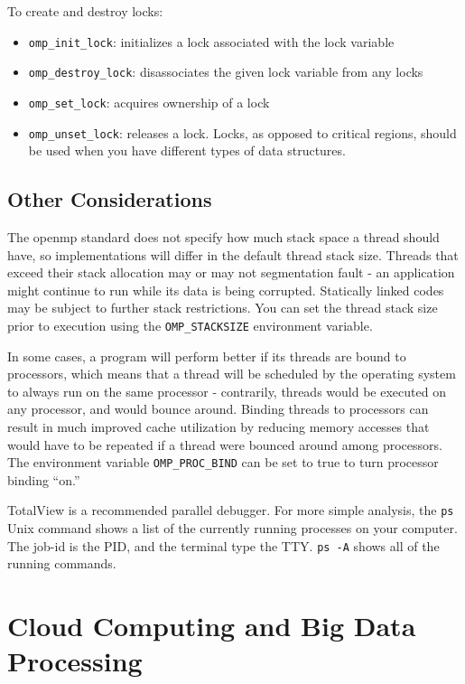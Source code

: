\documentclass[10pt]{article}
\begin{document}
\begin{flushleft}
To create and destroy locks:

\begin{itemize}
\item {\tt omp\_init\_lock}: initializes a lock associated with the lock variable
\item {\tt omp\_destroy\_lock}: disassociates the given lock variable from any locks
\item {\tt omp\_set\_lock}: acquires ownership of a lock
\item {\tt omp\_unset\_lock}: releases a lock. Locks, as opposed to critical regions, should be used when you have different types of data structures.
\end{itemize}

\subsection{Other Considerations}

The \gls{openmp} standard does not specify how much stack space a thread should have, so implementations will differ in the default thread stack size. Threads that exceed their stack allocation may or may not segmentation fault - an application might continue to run while its data is being corrupted. Statically linked codes may be subject to further stack restrictions. You can set the thread stack size prior to execution using the {\tt OMP\_STACKSIZE} environment variable. 

In some cases, a program will perform better if its threads are bound to processors, which means that a thread will be scheduled by the operating system to always run on the same processor - contrarily, threads would be executed on any processor, and would bounce around.  Binding threads to processors can result in much improved cache utilization by reducing memory accesses that would have to be repeated if a thread were bounced around among processors. The environment variable {\tt OMP\_PROC\_BIND} can be set to true to turn processor binding ``on.'' 

TotalView is a recommended parallel debugger. For more simple analysis, the {\tt ps} Unix command shows a list of the currently running processes on your computer. The job-id is the PID, and the terminal type the TTY. {\tt ps -A} shows all of the running commands. 

\section{Cloud Computing and Big Data Processing}


\end{flushleft}
\end{document}
